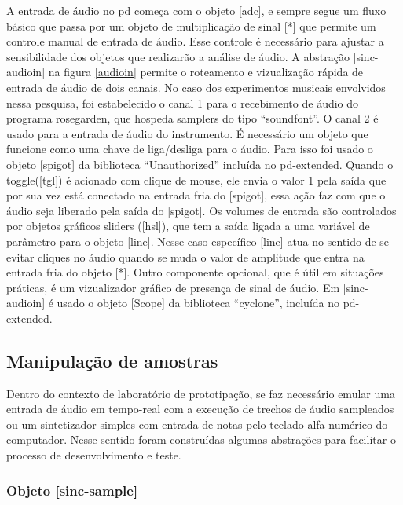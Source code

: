 \documentclass[draft]{ppgmus}
\begin{document}
A entrada de áudio no pd começa com o objeto  [adc\texttildelow], e sempre segue um fluxo
básico que passa por um objeto de multiplicação de sinal [*\texttildelow] que permite um
controle manual de entrada de áudio. Esse controle é necessário para ajustar 
a sensibilidade dos objetos que realizarão a análise de áudio. A abstração 
[sinc-audioin] na figura \ref{audioin} permite o roteamento e vizualização rápida 
de entrada de áudio de dois canais. No caso dos experimentos musicais envolvidos 
nessa pesquisa, foi estabelecido o canal 1 para o recebimento de áudio do programa 
rosegarden, que hospeda samplers do tipo ``soundfont''. O canal 2 é usado para 
a entrada de áudio do instrumento. É necessário um objeto que funcione como uma chave de
liga/desliga para o áudio. Para isso foi usado o objeto [spigot\texttildelow] da biblioteca
``Unauthorized'' incluída no pd-extended.
 Quando o toggle([tgl]) é acionado com clique de mouse,
ele envia o valor 1 pela saída que por sua vez está conectado na entrada fria do
[spigot\texttildelow], essa ação faz com que o áudio seja liberado pela saída do [spigot\texttildelow].
Os volumes de entrada são controlados por objetos gráficos sliders ([hsl]), que tem
a saída ligada a uma variável de parâmetro para o objeto [line\texttildelow]. Nesse caso específico
[line\texttildelow] atua no sentido de se evitar cliques no áudio quando se muda o valor de 
amplitude que entra na entrada fria do objeto [*\texttildelow]. Outro componente
opcional, que é útil em situações práticas, é um vizualizador gráfico de presença de sinal
de áudio. Em [sinc-audioin] é usado o objeto [Scope\texttildelow] da biblioteca ``cyclone'', 
incluída no pd-extended.


\subsection{Manipulação de amostras}


  Dentro do  contexto de laboratório de prototipação, se faz necessário emular uma entrada 
de áudio em tempo-real com a execução de trechos de áudio sampleados ou um sintetizador simples
com entrada de notas pelo teclado alfa-numérico do computador. Nesse sentido foram construídas
algumas abstrações para facilitar o processo de desenvolvimento e teste.

\subsubsection{Objeto [sinc-sample]}
\end{document}
